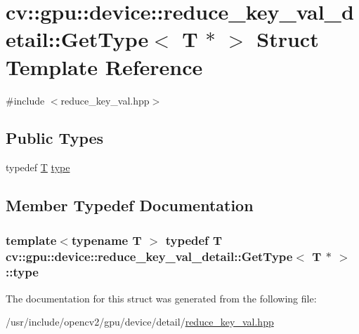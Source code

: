 \hypertarget{structcv_1_1gpu_1_1device_1_1reduce__key__val__detail_1_1GetType_3_01T_01_5_01_4}{\section{cv\-:\-:gpu\-:\-:device\-:\-:reduce\-\_\-key\-\_\-val\-\_\-detail\-:\-:Get\-Type$<$ T $\ast$ $>$ Struct Template Reference}
\label{structcv_1_1gpu_1_1device_1_1reduce__key__val__detail_1_1GetType_3_01T_01_5_01_4}
}


{\ttfamily \#include $<$reduce\-\_\-key\-\_\-val.\-hpp$>$}

\subsection*{Public Types}
\begin{DoxyCompactItemize}
\item 
typedef \hyperlink{calib3d_8hpp_a3efb9551a871ddd0463079a808916717}{T} \hyperlink{structcv_1_1gpu_1_1device_1_1reduce__key__val__detail_1_1GetType_3_01T_01_5_01_4_a7815a7bcac0daa56007fa16a624c0b54}{type}
\end{DoxyCompactItemize}


\subsection{Member Typedef Documentation}
\hypertarget{structcv_1_1gpu_1_1device_1_1reduce__key__val__detail_1_1GetType_3_01T_01_5_01_4_a7815a7bcac0daa56007fa16a624c0b54}{
\subsubsection[{type}]{\setlength{\rightskip}{0pt plus 5cm}template$<$typename T $>$ typedef {\bf T} {\bf cv\-::gpu\-::device\-::reduce\-\_\-key\-\_\-val\-\_\-detail\-::\-Get\-Type}$<$ {\bf T} $\ast$ $>$\-::{\bf type}}}\label{structcv_1_1gpu_1_1device_1_1reduce__key__val__detail_1_1GetType_3_01T_01_5_01_4_a7815a7bcac0daa56007fa16a624c0b54}


The documentation for this struct was generated from the following file\-:\begin{DoxyCompactItemize}
\item 
/usr/include/opencv2/gpu/device/detail/\hyperlink{reduce__key__val_8hpp}{reduce\-\_\-key\-\_\-val.\-hpp}\end{DoxyCompactItemize}
